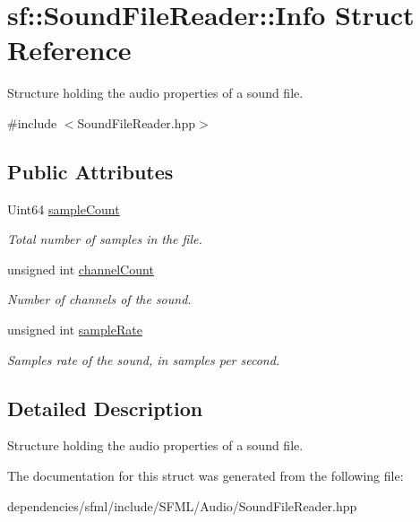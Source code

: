 \hypertarget{structsf_1_1_sound_file_reader_1_1_info}{}\section{sf\+:\+:Sound\+File\+Reader\+:\+:Info Struct Reference}
\label{structsf_1_1_sound_file_reader_1_1_info}


Structure holding the audio properties of a sound file.  




{\ttfamily \#include $<$Sound\+File\+Reader.\+hpp$>$}

\subsection*{Public Attributes}
\begin{DoxyCompactItemize}
\item 
\mbox{\label{structsf_1_1_sound_file_reader_1_1_info_a74b40b4693d7000571484736d1367167}} 
Uint64 \hyperlink{structsf_1_1_sound_file_reader_1_1_info_a74b40b4693d7000571484736d1367167}{sample\+Count}
\begin{DoxyCompactList}\small\item\em Total number of samples in the file. \end{DoxyCompactList}\item 
\mbox{\label{structsf_1_1_sound_file_reader_1_1_info_ac748bb30768d1a3caf329e95d31d6d2a}} 
unsigned int \hyperlink{structsf_1_1_sound_file_reader_1_1_info_ac748bb30768d1a3caf329e95d31d6d2a}{channel\+Count}
\begin{DoxyCompactList}\small\item\em Number of channels of the sound. \end{DoxyCompactList}\item 
\mbox{\label{structsf_1_1_sound_file_reader_1_1_info_a06ef71c19e7de190b294ae02c361f752}} 
unsigned int \hyperlink{structsf_1_1_sound_file_reader_1_1_info_a06ef71c19e7de190b294ae02c361f752}{sample\+Rate}
\begin{DoxyCompactList}\small\item\em Samples rate of the sound, in samples per second. \end{DoxyCompactList}\end{DoxyCompactItemize}


\subsection{Detailed Description}
Structure holding the audio properties of a sound file. 

The documentation for this struct was generated from the following file\+:\begin{DoxyCompactItemize}
\item 
dependencies/sfml/include/\+S\+F\+M\+L/\+Audio/Sound\+File\+Reader.\+hpp\end{DoxyCompactItemize}
